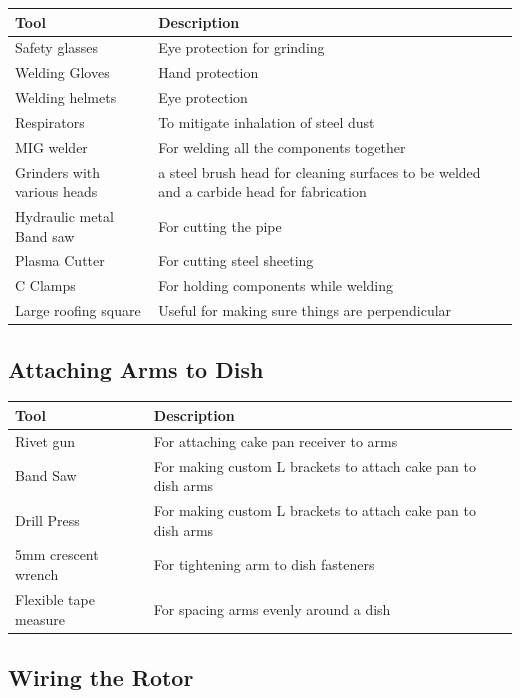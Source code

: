 \documentclass[11pt]{article} %
\begin{document}
\begin{tabular}{| l | p{10cm} |}
\hline
\textbf{Tool} & \textbf{Description} \\ \hline \hline
Safety glasses & Eye protection for grinding \\ \hline
Welding Gloves & Hand protection \\ \hline
Welding helmets & Eye protection \\ \hline
Respirators & To mitigate inhalation of steel dust \\ \hline
MIG welder & For welding all the components together \\ \hline
Grinders with various heads & a steel brush head for cleaning surfaces to be welded and a carbide head for fabrication \\ \hline
Hydraulic metal Band saw & For cutting the pipe \\ \hline
Plasma Cutter & For cutting steel sheeting \\ \hline
C Clamps & For holding components while welding \\ \hline
Large roofing square & Useful for making sure things are perpendicular \\ \hline
\end{tabular}


\subsection{Attaching Arms to Dish}

\begin{tabular}{| l | p{10cm} |}
\hline
\textbf{Tool} & \textbf{Description} \\ \hline \hline
Rivet gun & For attaching cake pan receiver to arms \\ \hline
Band Saw & For making custom L brackets to attach cake pan to dish arms \\ \hline
Drill Press & For making custom L brackets to attach cake pan to dish arms \\ \hline
5mm crescent wrench & For tightening arm to dish fasteners \\ \hline
Flexible tape measure & For spacing arms evenly around a dish \\ \hline
\end{tabular}


\subsection{Wiring the Rotor}
\end{document}
